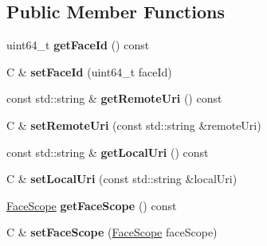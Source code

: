 \subsection*{Public Member Functions}
\begin{DoxyCompactItemize}
\item 
uint64\+\_\+t {\bfseries get\+Face\+Id} () const\hypertarget{classndn_1_1nfd_1_1FaceTraits_aec861bc52750aff8430ede4357c6f4a3}{}\label{classndn_1_1nfd_1_1FaceTraits_aec861bc52750aff8430ede4357c6f4a3}

\item 
C \& {\bfseries set\+Face\+Id} (uint64\+\_\+t face\+Id)\hypertarget{classndn_1_1nfd_1_1FaceTraits_a32e5045741514b416e7b87f10d3b2368}{}\label{classndn_1_1nfd_1_1FaceTraits_a32e5045741514b416e7b87f10d3b2368}

\item 
const std\+::string \& {\bfseries get\+Remote\+Uri} () const\hypertarget{classndn_1_1nfd_1_1FaceTraits_a89842d22e0c54c27aa5be96974ef6e4c}{}\label{classndn_1_1nfd_1_1FaceTraits_a89842d22e0c54c27aa5be96974ef6e4c}

\item 
C \& {\bfseries set\+Remote\+Uri} (const std\+::string \&remote\+Uri)\hypertarget{classndn_1_1nfd_1_1FaceTraits_a29ff1c324919f2ae278c681dcc31bbfd}{}\label{classndn_1_1nfd_1_1FaceTraits_a29ff1c324919f2ae278c681dcc31bbfd}

\item 
const std\+::string \& {\bfseries get\+Local\+Uri} () const\hypertarget{classndn_1_1nfd_1_1FaceTraits_a543a0bcdfce4d986d5d1cd511f49e46b}{}\label{classndn_1_1nfd_1_1FaceTraits_a543a0bcdfce4d986d5d1cd511f49e46b}

\item 
C \& {\bfseries set\+Local\+Uri} (const std\+::string \&local\+Uri)\hypertarget{classndn_1_1nfd_1_1FaceTraits_ac9112adc78b92c83a5fde1d331a0c8d7}{}\label{classndn_1_1nfd_1_1FaceTraits_ac9112adc78b92c83a5fde1d331a0c8d7}

\item 
\hyperlink{group__management_gaa49e0fd703a14e5bf904d15428fd6059}{Face\+Scope} {\bfseries get\+Face\+Scope} () const\hypertarget{classndn_1_1nfd_1_1FaceTraits_aefb72290e4fa549d83896e075dbb877d}{}\label{classndn_1_1nfd_1_1FaceTraits_aefb72290e4fa549d83896e075dbb877d}

\item 
C \& {\bfseries set\+Face\+Scope} (\hyperlink{group__management_gaa49e0fd703a14e5bf904d15428fd6059}{Face\+Scope} face\+Scope)\hypertarget{classndn_1_1nfd_1_1FaceTraits_a174fad77125fc9a2257fadbf5b533875}{}\label{classndn_1_1nfd_1_1FaceTraits_a174fad77125fc9a2257fadbf5b533875}


\end{DoxyCompactItemize}

